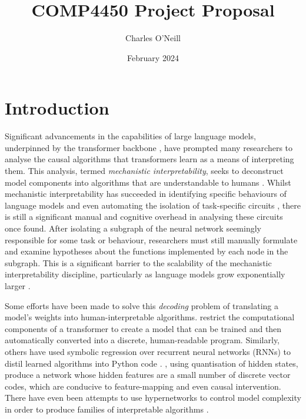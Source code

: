 \documentclass[11pt]{scrartcl}
\title{COMP4450 Project Proposal}
\author{Charles O'Neill}
\date{February 2024}
\begin{document}
\maketitle

\section{Introduction}

Significant advancements in the capabilities of large language models, underpinned by the transformer backbone \cite{vaswani2017attention}, have prompted many researchers to analyse the causal algorithms that transformers learn as a means of interpreting them. This analysis, termed \textit{mechanistic interpretability}, seeks to deconstruct model components into algorithms that are understandable to humans \cite{olah2018building}. Whilst mechanistic interpretability has succeeded in identifying specific behaviours of language models and even automating the isolation of task-specific circuits \cite{conmy2024towards}, there is still a significant manual and cognitive overhead in analysing these circuits once found. After isolating a subgraph of the neural network seemingly responsible for some task or behaviour, researchers must still manually formulate and examine hypotheses about the functions implemented by each node in the subgraph. This is a significant barrier to the scalability of the mechanistic interpretability discipline, particularly as language models grow exponentially larger \cite{kaplan2020scaling}.

Some efforts have been made to solve this \textit{decoding} problem of translating a model's weights into human-interpretable algorithms. \textcite{friedman2024learning} restrict the computational components of a transformer to create a model that can be trained and then automatically converted into a discrete, human-readable program. Similarly, others have used symbolic regression over recurrent neural networks (RNNs) to distil learned algorithms into Python code \cite{michaud2024opening}. \textcite{tamkin2023codebook}, using quantisation of hidden states, produce a network whose hidden features are a small number of discrete vector codes, which are conducive to feature-mapping and even causal intervention. There have even been attempts to use hypernetworks \cite{krueger2017bayesian} to control model complexity in order to produce families of interpretable algorithms \cite{liao2023generating}.
\end{document}
